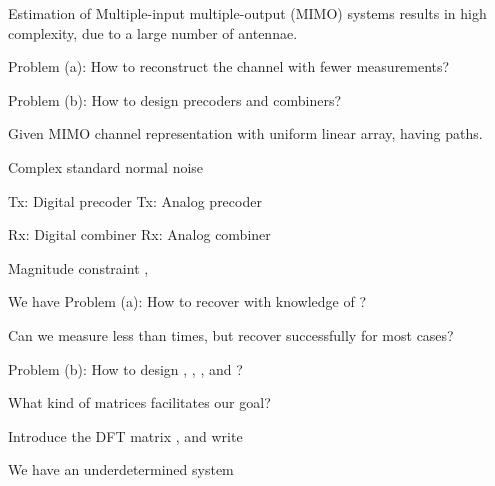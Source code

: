 
\Title {\TitleText}
\blank [big]

\Subtitle {\AuthorText}
\blank [big]

\Subsubtitle {\InstitutionText}

\page [yes]
{
\blank [big]

\I Estimation of Multiple-input multiple-output (MIMO) systems results in high complexity, due to a large number of antennae.

\I Problem (a): How to reconstruct the channel with fewer measurements?

\I Problem (b): How to design precoders and combiners?
}
{
\I Given MIMO channel representation  with uniform linear array, having  paths.

\I Complex standard normal noise 

\I Tx: Digital precoder 
\I Tx: Analog precoder 

\I Rx: Digital combiner 
\I Rx: Analog combiner 

\I Magnitude constraint ,  
}
{
\I We have 
%
\I Problem (a): How to recover  with knowledge of ?

\I Can we measure less than  times, but recover successfully for most cases?

\I Problem (b): How to design , , , and ?

\I What kind of matrices facilitates our goal?
}
{
\I Introduce the DFT matrix , and write

\I We have an underdetermined system 
}
